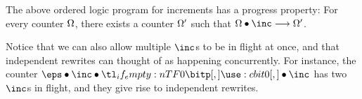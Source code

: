 The above ordered logic program for increments has a progress property:
For every counter $\Omega$, there exists a counter $\Omega'$ such that $\octx \fuse \inc \trans \octx'$.


Notice that we can also allow multiple $\inc$s to be in flight at once, and that independent rewrites can thought of as happening concurrently.
For instance, the counter $\eps \fuse \inc \fuse \bit{0} \fuse \inc$ has two $\inc$s in flight, and they give rise to independent rewrites.
\begin{center}
\end{center}



